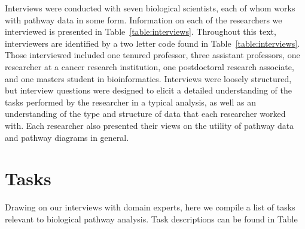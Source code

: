 \documentclass[review,journal]{vgtc}         %
\newcounter{task}
\begin{document}
Interviews were conducted with seven biological scientists, each of whom works with pathway data in some form. Information on each of the researchers we interviewed is presented in Table~\ref{table:interviews}. Throughout this text, interviewers are identified by a two letter code found in Table~\ref{table:interviews}. Those interviewed included one tenured professor, three assistant professors, one researcher at a cancer research institution, one postdoctoral research associate, and one masters student in bioinformatics. Interviews were loosely structured, but interview questions were designed to elicit a detailed understanding of the tasks performed by the researcher in a typical analysis, as well as an understanding of the type and structure of data that each researcher worked with. Each researcher also presented their views on the utility of pathway data and pathway diagrams in general.

\section{Tasks}

Drawing on our interviews with domain experts, here we compile a list of tasks relevant to biological pathway analysis. Task descriptions can be found in Table 
\end{document}
